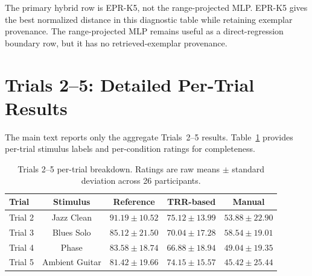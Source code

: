 \documentclass{article}
\begin{document}
The primary hybrid row is EPR-K5, not the range-projected MLP. EPR-K5 gives the best normalized distance in this diagnostic table while retaining exemplar provenance. The range-projected MLP remains useful as a direct-regression boundary row, but it has no retrieved-exemplar provenance.

\section{Trials 2--5: Detailed Per-Trial Results}

The main text reports only the aggregate Trials~2--5 results. Table~\ref{tab:trials2to5_detailed} provides per-trial stimulus labels and per-condition ratings for completeness.

\begin{table}[htbp]
	\centering
	\caption{Trials 2--5 per-trial breakdown. Ratings are raw means $\pm$ standard deviation across 26 participants.}
	\label{tab:trials2to5_detailed}
	\small
	\begin{tabular}{lcccc}
		\toprule
		\textbf{Trial} & \textbf{Stimulus} & \textbf{Reference} & \textbf{TRR-based} & \textbf{Manual} \\
		\midrule
		Trial 2 & Jazz Clean & $91.19 \pm 10.52$ & $75.12 \pm 13.99$ & $53.88 \pm 22.90$ \\
		Trial 3 & Blues Solo & $85.12 \pm 21.50$ & $70.04 \pm 17.28$ & $58.54 \pm 19.01$ \\
		Trial 4 & Phase & $83.58 \pm 18.74$ & $66.88 \pm 18.94$ & $49.04 \pm 19.35$ \\
		Trial 5 & Ambient Guitar & $81.42 \pm 19.66$ & $74.15 \pm 15.57$ & $45.42 \pm 25.44$ \\
		\bottomrule
	\end{tabular}
\end{table}
\end{document}
